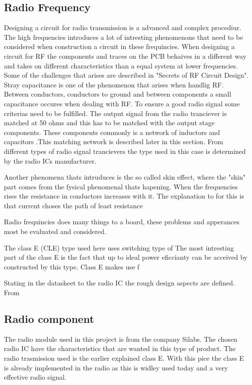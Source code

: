 \subsection{Radio Frequency}
Designing a circuit for radio transmission is a advanced and complex procediur. The high frequencies introduces a lot of intresting phenomenons that need to be considered when construction a circuit in these frequincies. When designing a circuit for RF the components and traces on the PCB behaives in a different way and takes on different characteristics than a equal system at lower frequencies. Some of the challenges that arises are described in "Secrets of RF Circuit Design". Stray capacitance is one of the phenomenon that arises when handlig RF. Between conductors, conductors to ground and between components a small capacitance occures when dealing with RF. To ensure a good radio signal  some criterias need to be fulfilled. 
The output signal from the radio tranciever is matched at 50 ohms and this has to be matched with the output stage components. These components commonly is a network of inductors and capacitors .This matching network is described later in this section. 
From different types of radio signal trancievers the type used in this case is determined by the radio ICs manufacturer. %
 

Another phenomena thats intruduces is the so called skin effect, where the "skin" part comes from the fysical phenomenal thats hapening. When the frequencies rises the resistance in conductors increases with it. The explanation to for this is that current choses the path of least resistance


Radio frequincies does many things to a board, these problems and apperances most be evaluated and considered.  


\cite{class_e_new}
The class E (CLE) type used here uses switching type of 
The most intresting part of the class E is the fact that up to ideal power eficcianty can be acceived by constructed by this type. Class E makes use f

Stating in the datasheet to the radio IC the rough design aspects are defined. From

\subsection{Radio component}
 The radio module used in this project is from the company Silabs. The chosen radio IC have the characteristics that are wanted in this type of product. The radio trasmission used is the earlier explained class E. With this pice the class E is already implemented in the radio as this is widley used today and a very effective radio signal. 

